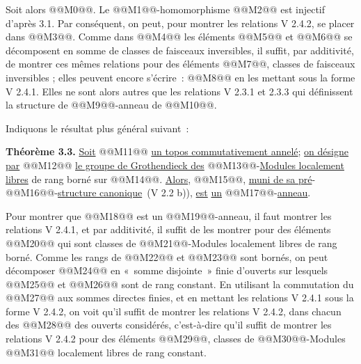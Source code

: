 
Soit alors @@M0@@. Le @@M1@@-homomorphisme @@M2@@ est injectif d'après 3.1. Par conséquent, on peut, pour montrer les relations V 2.4.2, se placer dans @@M3@@. Comme dans @@M4@@ les éléments @@M5@@ et @@M6@@ se décomposent en somme de classes de faisceaux inversibles, il suffit, par additivité, de montrer ces mêmes relations pour des éléments @@M7@@, classes de faisceaux inversibles ; elles peuvent encore s'écrire~:
@@M8@@
en les mettant sous la forme V 2.4.1. Elles ne sont alors autres que les relations V 2.3.1 et 2.3.3 qui définissent la structure de @@M9@@-anneau de @@M10@@.

Indiquons le résultat plus général suivant~:

\textbf{Théorème 3.3.} \uline{Soit} @@M11@@ \uline{un topos commutativement annelé}; \uline{on désigne par} @@M12@@ \uline{le groupe de Grothendieck des} @@M13@@-\uline{Modules localement libres} de rang borné sur @@M14@@. \uline{Alors}, @@M15@@, \uline{muni de sa pré}-@@M16@@-\uline{structure canonique}~(V 2.2 b)), \uline{est} \uline{un} @@M17@@-\uline{anneau}.

Pour montrer que @@M18@@ est un @@M19@@-anneau, il faut montrer les relations V 2.4.1, et par additivité, il suffit de les montrer pour des éléments @@M20@@ qui sont classes de @@M21@@-Modules localement libres de rang borné. Comme les rangs de @@M22@@ et @@M23@@ sont bornés, on peut décomposer @@M24@@ en «~somme disjointe~» finie d'ouverts sur lesquels @@M25@@ et @@M26@@ sont de rang constant. En utilisant la commutation du @@M27@@ aux sommes directes finies, et en mettant les relations V 2.4.1 sous la forme V 2.4.2, on voit qu'il suffit de montrer les relations V 2.4.2, dans chacun des @@M28@@ des ouverts considérés, c'est-à-dire qu'il suffit de montrer les relations V 2.4.2 pour des éléments @@M29@@, classes de @@M30@@-Modules @@M31@@ localement libres de rang constant.

